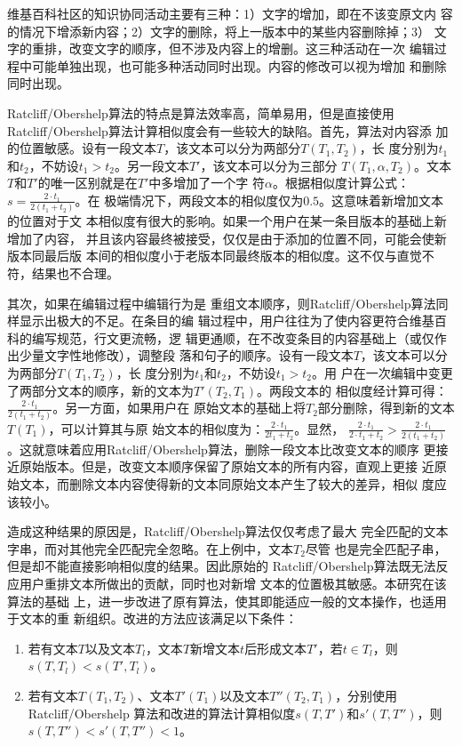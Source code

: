 维基百科社区的知识协同活动主要有三种：1）文字的增加，即在不该变原文内
容的情况下增添新内容；2）文字的删除，将上一版本中的某些内容删除掉；3）
文字的重排，改变文字的顺序，但不涉及内容上的增删。这三种活动在一次
编辑过程中可能单独出现，也可能多种活动同时出现。内容的修改可以视为增加
和删除同时出现。

Ratcliff/Obershelp算法的特点是算法效率高，简单易用，但是直接使用
Ratcliff/Obershelp算法计算相似度会有一些较大的缺陷。首先，算法对内容添
加的位置敏感。设有一段文本$T$，该文本可以分为两部分$T(T_1,T_2)$，长
度分别为$t_1$和$t_2$，不妨设$t_1>t_2$。另一段文本$T'$，该文本可以分为三部分
$T(T_1,\alpha,T_2)$。文本$T$和$T'$的唯一区别就是在$T'$中多增加了一个字
符$\alpha$。根据相似度计算公式：$s=\frac{2 \cdot t_1}{2(t_1+t_2)}$。在
极端情况下，两段文本的相似度仅为$0.5$。这意味着新增加文本的位置对于文
本相似度有很大的影响。如果一个用户在某一条目版本的基础上新增加了内容，
并且该内容最终被接受，仅仅是由于添加的位置不同，可能会使新版本同最后版
本间的相似度小于老版本同最终版本的相似度。这不仅与直觉不符，结果也不合理。

其次，如果在编辑过程中编辑行为是
重组文本顺序，则Ratcliff/Obershelp算法同样显示出极大的不足。在条目的编
辑过程中，用户往往为了使内容更符合维基百科的编写规范，行文更流畅，逻
辑更通顺，在不改变条目的内容基础上（或仅作出少量文字性地修改），调整段
落和句子的顺序。设有一段文本$T$，该文本可以分为两部分$T(T_1,T_2)$，长
度分别为$t_1$和$t_2$，不妨设$t_1>t_2$。用
户在一次编辑中变更了两部分文本的顺序，新的文本为$T'(T_2,T_1)$。两段文本的
相似度经计算可得：$\frac{2 \cdot t_1}{2(t_1+t_2)}$。另一方面，如果用户在
原始文本的基础上将$T_2$部分删除，得到新的文本$T(T_1)$，可以计算其与原
始文本的相似度为：$\frac{2 \cdot t_1}{2t_1+t_2}$。显然，
$
\frac{2 \cdot t_1}{2 \cdot t_1+t_2}>\frac{2 \cdot t_1}{2(t_1+t_2)}
$。这就意味着应用Ratcliff/Obershelp算法，删除一段文本比改变文本的顺序
更接近原始版本。但是，改变文本顺序保留了原始文本的所有内容，直观上更接
近原始文本，而删除文本内容使得新的文本同原始文本产生了较大的差异，相似
度应该较小。

造成这种结果的原因是，Ratcliff/Obershelp算法仅仅考虑了最大
完全匹配的文本字串，而对其他完全匹配完全忽略。在上例中，文本$T_2$尽管
也是完全匹配子串，但是却不能直接影响相似度的结果。因此原始的
Ratcliff/Obershelp算法既无法反应用户重排文本所做出的贡献，同时也对新增
文本的位置极其敏感。本研究在该算法的基础
上，进一步改进了原有算法，使其即能适应一般的文本操作，也适用于文本的重
新组织。改进的方法应该满足以下条件：
\begin{enumerate}
\item 若有文本$T$以及文本$T_l$，文本$T$新增文本$t$后形成文本$T'$，若$t
  \in T_l$，则$s(T,T_l)<s(T',T_l)$。
\item 若有文本$T(T_1,T_2)$、文本$T'(T_1)$以及文本$T''(T_2,T_1)$，分别使用Ratcliff/Obershelp
  算法和改进的算法计算相似度$s(T,T')$和$s'(T,T'')$，则$s(T,T'')<s'(T,T'')<1$。
\end{enumerate}

